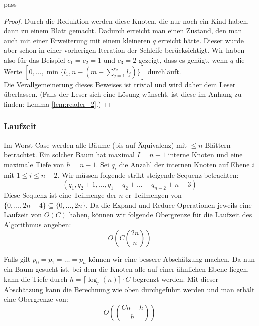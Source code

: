 pass\documentclass[a4paper,10pt,ngerman]{scrartcl}
\begin{document}
\begin{proof}
        Durch die Reduktion werden diese Knoten, die nur noch ein Kind haben, dann zu einem Blatt gemacht.
        Dadurch erreicht man einen Zustand, den man auch mit einer Erweiterung mit einem kleineren $q$ erreicht hätte.
        Dieser wurde aber schon in einer vorherigen Iteration der Schleife berücksichtigt.
        Wir haben also für das Beispiel $c_1 = c_2 = 1$ und $c_3 = 2$ gezeigt, dass es genügt, wenn $q$ die Werte $[0, \dots, \min\{l_1, n - (m + \sum^{c_2}_{j=1} l_j)\}]$ durchläuft.\\
        Die Verallgemeinerung dieses Beweises ist trivial und wird daher dem Leser überlassen.
        (Falls der Leser sich eine Lösung wünscht, ist diese im Anhang zu finden: Lemma \ref{lem:reader_2}.)
    \end{proof}

    \subsubsection{Laufzeit}
    Im Worst-Case werden alle Bäume (bis auf Äquivalenz) mit $\le n$ Blättern betrachtet.
    Ein solcher Baum hat maximal $I = n - 1$ interne Knoten und eine maximale Tiefe von $h = n - 1$.
    Sei $q_i$ die Anzahl der internen Knoten auf Ebene $i$ mit $1 \le i \le n - 2$.
    Wir müssen folgende strikt steigende Sequenz betrachten:
    \[(q_1, q_2 + 1, \dots, q_1 + q_2 + \dots + q_{n - 2} + n - 3)\]
    Diese Sequenz ist eine Teilmenge der $n$-er Teilmengen von $\{0, \dots, 2n - 4\} \subseteq \{0, \dots, 2n\}$.
    Da die Expand und Reduce Operationen jeweils eine Laufzeit von $O(C)$ haben, können wir folgende Obergrenze für die Laufzeit des Algorithmus angeben:
    \[O\left(C{{2n} \choose n}  \right)\]

    Falls gilt $p_0 = p_1 = \dots = p_n$ können wir eine bessere Abschätzung machen.
    Da nun ein Baum gesucht ist, bei dem die Knoten alle auf einer ähnlichen Ebene liegen, kann die Tiefe durch $h = \lceil \log_r(n) \rceil \cdot C$
    begrenzt werden.
    Mit dieser Abschätzung kann die Berechnung wie oben durchgeführt werden und man erhält eine Obergrenze von:
    \[O\left(C{n + h} \choose h \right)\]
\end{document}

